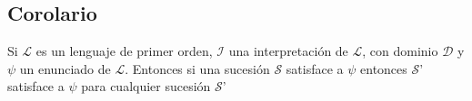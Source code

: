 \subsection{Corolario}

Si $\mathcal{L}$ es un lenguaje de primer orden, $\mathcal{I}$ una interpretaci\'on de $\mathcal{L}$, con dominio $\mathcal{D}$ y $\psi$ un enunciado de $\mathcal{L}$. Entonces si una sucesi\'on $\mathcal{S}$ satisface a $\psi$ entonces $\mathcal{S}$' satisface a $\psi$ para cualquier sucesi\'on $\mathcal{S}$'
